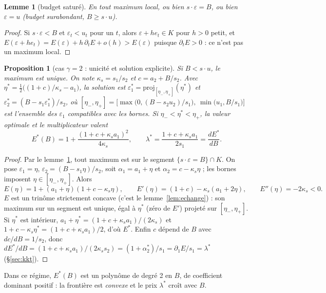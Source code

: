 \documentclass[11pt,a4paper]{article}
\theoremstyle{plain}
\newtheorem{proposition}{Proposition}
\newtheorem{lemme}{Lemme}
\theoremstyle{definition}
\begin{document}
\begin{lemme}[budget saturé]\label{lem:sature}
En tout maximum local, ou bien $s\cdot\varepsilon=B$, ou bien $\varepsilon=u$ (budget surabondant, $B\ge s\cdot u$).
\end{lemme}
\begin{proof}
Si $s\cdot\varepsilon<B$ et $\varepsilon_t<u_t$ pour un $t$, alors $\varepsilon+he_t\in K$ pour $h>0$ petit, et $E(\varepsilon+he_t)=E(\varepsilon)+h\,\partial_tE+o(h)>E(\varepsilon)$ puisque $\partial_tE>0$ : ce n'est pas un maximum local.
\end{proof}

\begin{proposition}[cas $\gamma=2$ : unicité et solution explicite]\label{prop:gamma2}
Si $B<s\cdot u$, le maximum est unique. On note $\kappa_s=s_1/s_2$ et $c=a_2+B/s_2$. Avec $\eta^*=\tfrac12\big((1+c)/\kappa_s-a_1\big)$, la solution est $\varepsilon_1^*=\mathrm{proj}_{[\eta_-,\eta_+]}(\eta^*)$ et $\varepsilon_2^*=(B-s_1\varepsilon_1^*)/s_2$, où $[\eta_-,\eta_+]=\big[\max\big(0,(B-s_2u_2)/s_1\big),\ \min\big(u_1,B/s_1\big)\big]$ est l'ensemble des $\varepsilon_1$ compatibles avec les bornes. Si $\eta_-<\eta^*<\eta_+$, la valeur optimale et le multiplicateur valent
\[E^*(B)=1+\frac{(1+c+\kappa_sa_1)^2}{4\kappa_s},\qquad \lambda^*=\frac{1+c+\kappa_sa_1}{2s_1}=\frac{dE^*}{dB}.\]
\end{proposition}
\begin{proof}
Par le lemme~\ref{lem:sature}, tout maximum est sur le segment $\{s\cdot\varepsilon=B\}\cap K$. On pose $\varepsilon_1=\eta$, $\varepsilon_2=(B-s_1\eta)/s_2$, soit $\alpha_1=a_1+\eta$ et $\alpha_2=c-\kappa_s\eta$ ; les bornes imposent $\eta\in[\eta_-,\eta_+]$. Alors
\[E(\eta)=1+(a_1+\eta)(1+c-\kappa_s\eta),\qquad E'(\eta)=(1+c)-\kappa_s(a_1+2\eta),\qquad E''(\eta)=-2\kappa_s<0.\]
$E$ est un trinôme strictement concave (c'est le lemme~\ref{lem:echange}) : son maximum sur un segment est unique, égal à $\eta^*$ (zéro de $E'$) projeté sur $[\eta_-,\eta_+]$. Si $\eta^*$ est intérieur, $a_1+\eta^*=(1+c+\kappa_sa_1)/(2\kappa_s)$ et $1+c-\kappa_s\eta^*=(1+c+\kappa_sa_1)/2$, d'où $E^*$. Enfin $c$ dépend de $B$ avec $dc/dB=1/s_2$, donc $dE^*/dB=(1+c+\kappa_sa_1)/(2\kappa_ss_2)=(1+\alpha_2^*)/s_1=\partial_1E/s_1=\lambda^*$ (§\ref{sec:kkt}).
\end{proof}
Dans ce régime, $E^*(B)$ est un polynôme de degré 2 en $B$, de coefficient dominant positif : la frontière est \emph{convexe} et le prix $\lambda^*$ croît avec $B$.
\end{document}
